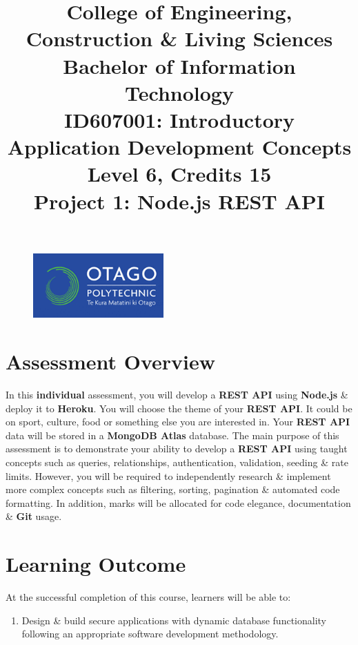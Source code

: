 \documentclass{article}
\author{}
\begin{document}
\begin{figure}
	\centering
	\includegraphics[width=50mm]{../img/logo.png}
\end{figure}

\title{College of Engineering, Construction \& Living Sciences\\Bachelor of Information Technology\\ID607001: Introductory Application Development Concepts\\Level 6, Credits 15\\\textbf{Project 1: Node.js REST API}}
\date{}
\maketitle

\section*{Assessment Overview}
In this \textbf{individual} assessment, you will develop a \textbf{REST API} using \textbf{Node.js} \& deploy it to \textbf{Heroku}. You will choose the theme of your \textbf{REST API}. It could be on sport, culture, food or something else you are interested in. Your \textbf{REST API} data will be stored in a \textbf{MongoDB Atlas} database. The main purpose of this assessment is to demonstrate your ability to develop a \textbf{REST API} using taught concepts such as queries, relationships, authentication, validation, seeding \& rate limits. However, you will be required to independently research \& implement more complex concepts such as filtering, sorting, pagination \& automated code formatting. In addition, marks will be allocated for code elegance, documentation \& \textbf{Git} usage.

\section*{Learning Outcome}
At the successful completion of this course, learners will be able to:
\begin{enumerate}
	\item Design \& build secure applications with dynamic database functionality following an appropriate software development methodology.
\end{enumerate}
\end{document}
